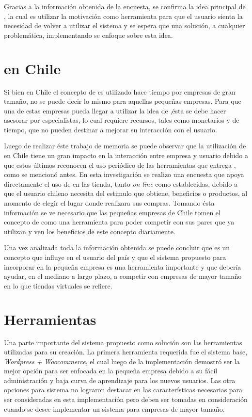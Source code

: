 Gracias a la información obtenida de la encuesta, se confirma la
idea principal de {\gam}, la cual es utilizar la motivación como herramienta para
que el usuario sienta la necesidad de volver a utilizar el sistema y
se espera que una solución, a cualquier problemática, implementando {\gam} se
enfoque sobre esta idea.

\section{{\GAM} en Chile}

Si bien en Chile el concepto de {\gam} es utilizado hace tiempo por empresas de gran tamaño, no se
puede decir lo mismo para aquellas pequeñas empresas. Para que una de estas empresas pueda
llegar a utilizar la idea de {\gam},ésta se debe hacer asesorar por especialistas, lo cual
requiere recursos, tales como monetarios y de tiempo, que no pueden destinar a mejorar su interacción con el usuario.

Luego de realizar éste trabajo de memoria se puede observar que la utilización de {\gam} en Chile tiene
un gran impacto en la interacción entre empresa y usuario debido a que estos últimos reconocen el uso
periódico de las herramientas que entrega {\gam}, como se mencionó antes.
En esta investigación se realizo una encuesta que apoya directamente el uso de {\gam} en las tienda, tanto
\emph{on-line} como establecidas, debido a que el usuario chileno necesita del estimulo que obtiene, beneficios o productos,
al momento de elegir el lugar donde realizara sus compras. Tomando ésta información se ve necesario que las
pequeñas empresas de Chile tomen el concepto de {\gam} como una herramienta para poder competir con sus
pares que ya utilizan {\gam} y ven los beneficios de este concepto diariamente.

Una vez analizada toda la información obtenida se puede concluir que {\gam} es un concepto que influye
en el usuario del país y que el sistema propuesto para incorporar {\gam} en la pequeña empresa
es una herramienta importante y que debería ayudar, en el mediano a largo plazo, a competir con empresas
de mayor tamaño en lo que tiendas virtuales se refiere.

\section{Herramientas}

Una parte importante del sistema propuesto como solución son las herramientas utilizadas para su creación.
La primera herramienta requerida fue el sistema base, \emph{Wordpress + Woocommerce}, el cual luego de
la implementación demostró ser la mejor opción para ser enfocada en la pequeña empresa debido a su
fácil administración y baja curva de aprendizaje para los nuevos usuarios. Las otra opciones para sistema no lograron
destacar en las características necesarias para ser consideradas en esta implementación pero deben ser
tomadas en consideración cuando se desee implementar un sistema para empresas de mayor tamaño.

